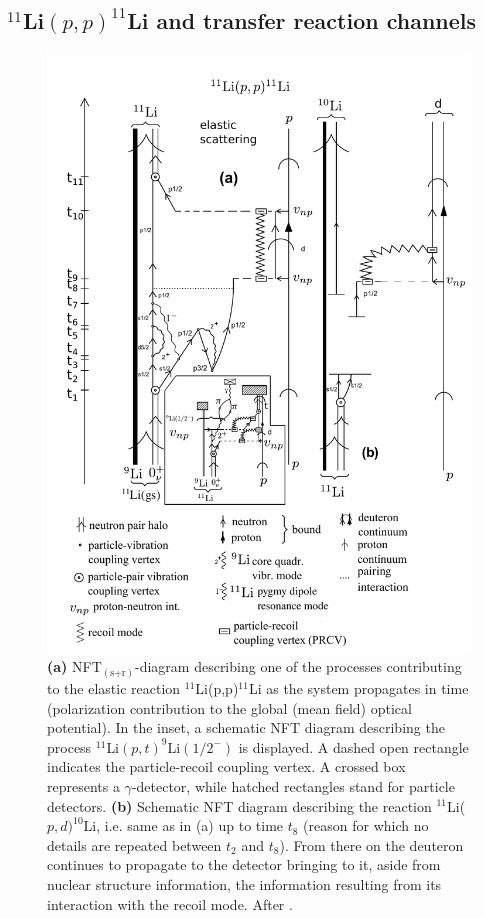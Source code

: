 \subsection{$^{11}$Li$(p,p)^{11}$Li and transfer reaction channels}
     \begin{figure}
     \centerline {
     \includegraphics*[width=12cm]{introduccion/figs/fig1_9_2xx}
     }
     \caption[$^{11}$Li(p,p)$^{11}$Li NFT$_{(\text{s+r})}$ diagram.]{ {\bf (a)}  NFT$_{(\text{s+r})}$-diagram describing  one of the processes contributing to the elastic reaction $^{11}$Li(p,p)$^{11}$Li as the system propagates in time
         	    	(polarization contribution to the global  (mean field) optical potential). In the inset, a schematic NFT diagram describing the process $^{11}$Li$(p,t)^{9}$Li$(1/2^-)$ is displayed. A dashed open rectangle indicates the particle-recoil coupling vertex. A crossed box represents a $\gamma$-detector, while hatched rectangles stand for particle detectors. 
         	    	 {\bf (b)} Schematic NFT diagram describing the reaction $^{11}$Li($p,d)^{10}$Li, i.e. same as in (a)  up to time $t_8$ (reason for which no  details are repeated between $t_2$ and $t_8$). From there on  the deuteron continues  to propagate  to the detector bringing to it, aside from nuclear structure information, the information resulting from its interaction with the recoil mode. After \cite{Broglia:16}.}
     \label{fig1.9.2}
     \end{figure}
